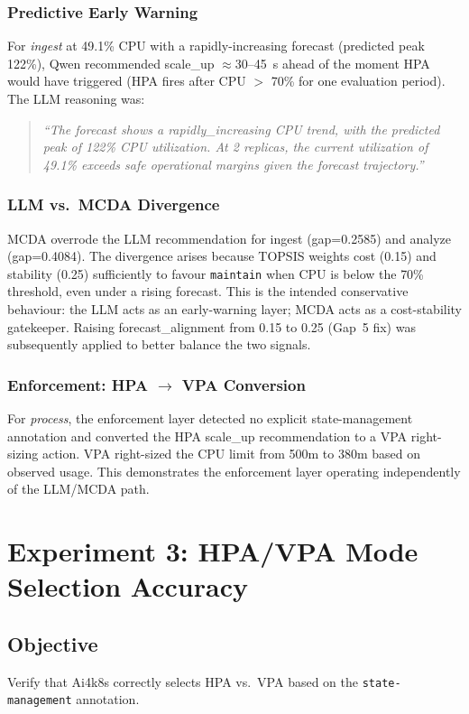 \subsubsection{Predictive Early Warning}
For \textit{ingest} at 49.1\% CPU with a rapidly-increasing forecast (predicted
peak 122\%), Qwen recommended scale\_up $\approx$30--45~s ahead of the moment
HPA would have triggered (HPA fires after CPU $>$ 70\% for one evaluation
period). The LLM reasoning was:
\begin{quote}
  \textit{``The forecast shows a rapidly\_increasing CPU trend, with the predicted
  peak of 122\% CPU utilization. At 2 replicas, the current utilization of 49.1\%
  exceeds safe operational margins given the forecast trajectory.''}
\end{quote}

\subsubsection{LLM vs.\ MCDA Divergence}
MCDA overrode the LLM recommendation for ingest (gap=0.2585) and analyze
(gap=0.4084). The divergence arises because TOPSIS weights cost (0.15) and
stability (0.25) sufficiently to favour \texttt{maintain} when CPU is below
the 70\% threshold, even under a rising forecast. This is the intended conservative
behaviour: the LLM acts as an early-warning layer; MCDA acts as a cost-stability
gatekeeper. Raising forecast\_alignment from 0.15 to 0.25 (Gap~5 fix) was
subsequently applied to better balance the two signals.

\subsubsection{Enforcement: HPA $\to$ VPA Conversion}
For \textit{process}, the enforcement layer detected no explicit state-management
annotation and converted the HPA scale\_up recommendation to a VPA right-sizing
action. VPA right-sized the CPU limit from 500m to 380m based on observed
usage. This demonstrates the enforcement layer operating independently of the
LLM/MCDA path.

\section{Experiment 3: HPA/VPA Mode Selection Accuracy}
\label{sec:exp3}

\subsection{Objective}
Verify that Ai4k8s correctly selects HPA vs.\ VPA based on the
\texttt{state-management} annotation.

